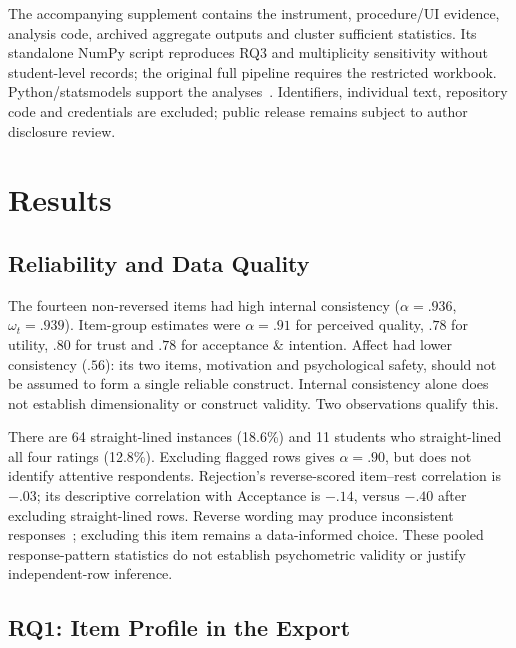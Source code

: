 \documentclass[runningheads]{llncs}
\begin{document}
The accompanying supplement contains the instrument, procedure/UI evidence, analysis code, archived aggregate outputs and cluster sufficient statistics. Its standalone NumPy script reproduces RQ3 and multiplicity sensitivity without student-level records; the original full pipeline requires the restricted workbook. Python/statsmodels support the analyses~\cite{seabold2010statsmodels}. Identifiers, individual text, repository code and credentials are excluded; public release remains subject to author disclosure review.

\section{Results}
\label{sec:results}

\subsection{Reliability and Data Quality}
\label{sec:quality}
The fourteen non-reversed items had high internal consistency ($\alpha=.936$, $\omega_t=.939$). Item-group estimates were $\alpha=.91$ for perceived quality, $.78$ for utility, $.80$ for trust and $.78$ for acceptance \& intention. Affect had lower consistency ($.56$): its two items, motivation and psychological safety, should not be assumed to form a single reliable construct. Internal consistency alone does not establish dimensionality or construct validity. Two observations qualify this.

There are 64 straight-lined instances (18.6\%) and 11 students who straight-lined all four ratings (12.8\%). Excluding flagged rows gives $\alpha=.90$, but does not identify attentive respondents. Rejection's reverse-scored item--rest correlation is $-.03$; its descriptive correlation with Acceptance is $-.14$, versus $-.40$ after excluding straight-lined rows. Reverse wording may produce inconsistent responses~\cite{vansonderen2013ineffectiveness}; excluding this item remains a data-informed choice. These pooled response-pattern statistics do not establish psychometric validity or justify independent-row inference.

\subsection{RQ1: Item Profile in the Export}
\end{document}
